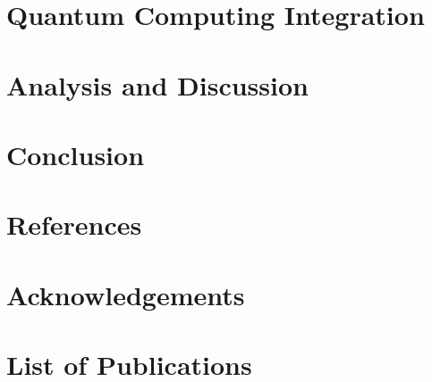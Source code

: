 \documentclass[12pt]{report}
\begin{document}
\chapter{Quantum Computing Integration}


\chapter{Analysis and Discussion}


\chapter{Conclusion}


\newpage
\chapter*{References}




\newpage
\chapter*{Acknowledgements}


\newpage
\chapter*{List of Publications}

\end{document}
